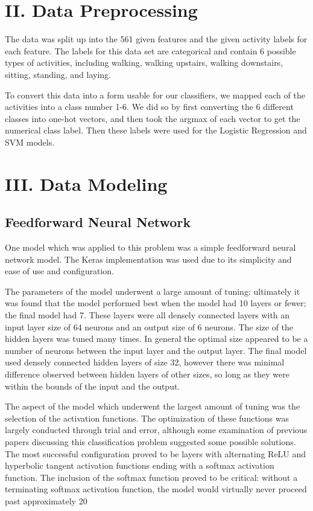 \documentclass[12pt]{article}
\begin{document}
\section*{II. Data Preprocessing}
 	The data was split up into the 561 given features and the given activity labels for each feature. The labels for this data set are categorical and contain 6 possible types of activities, including walking, walking upstairs, walking downstairs, sitting, standing, and laying. 
 	
   \newline \newline To convert this data into a form usable for our classifiers, we mapped each of the activities into a class number 1-6. We did so by first converting the 6 different classes into one-hot vectors, and then took the argmax of each vector to get the numerical class label. Then these labels were used for the Logistic Regression and SVM models.
   
\section*{III. Data Modeling}
\subsection*{Feedforward Neural Network}
One model which was applied to this problem was a simple feedforward neural network model. The Keras implementation was used due to its simplicity and ease of use and configuration.

The parameters of the model underwent a large amount of tuning: ultimately it was found that the model performed best when the model had 10 layers or fewer; the final model had 7. These layers were all densely connected layers with an input layer size of 64 neurons and an output size of 6 neurons. The size of the hidden layers was tuned many times. In general the optimal size appeared to be a number of neurons between the input layer and the output layer. The final model used densely connected hidden layers of size 32, however there was minimal difference observed between hidden layers of other sizes, so long as they were within the bounds of the input and the output.

The aspect of the model which underwent the largest amount of tuning was the selection of the activation functions. The optimization of these functions was largely conducted through trial and error, although some examination of previous papers discussing this classification problem suggested some possible solutions. The most successful configuration proved to be layers with alternating ReLU and hyperbolic tangent activation functions ending with a softmax activation function. The inclusion of the softmax function proved to be critical: without a terminating softmax activation function, the model would virtually never proceed past approximately 20%
\end{document}
